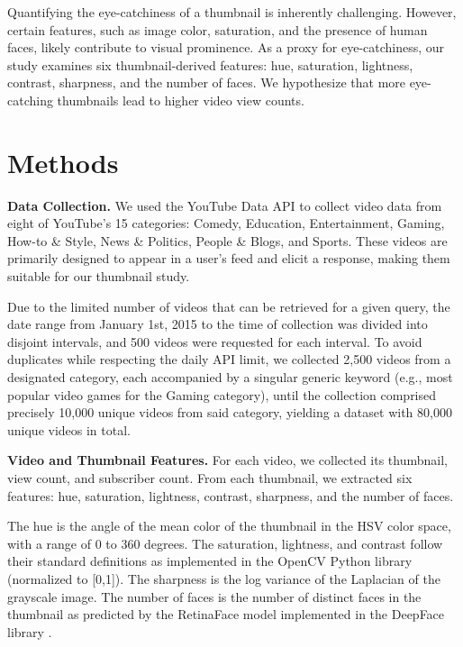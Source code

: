\documentclass{article}
\begin{document}
Quantifying the eye-catchiness of a thumbnail is inherently challenging. However, certain features, such as image color, saturation, and the presence of human faces, likely contribute to visual prominence. As a proxy for eye-catchiness, our study examines six thumbnail-derived features: hue, saturation, lightness, contrast, sharpness, and the number of faces. We hypothesize that more eye-catching thumbnails lead to higher video view counts.

\section{Methods}

\textbf{Data Collection.} We used the YouTube Data API \cite{youtubeapi} to collect video data from eight of YouTube's 15 categories: Comedy, Education, Entertainment, Gaming, How-to \& Style, News \& Politics, People \& Blogs, and Sports. These videos are primarily designed to appear in a user's feed and elicit a response, making them suitable for our thumbnail study.

Due to the limited number of videos that can be retrieved for a given query, the date range from January 1st, 2015 to the time of collection was divided into disjoint intervals, and 500 videos were requested for each interval. To avoid duplicates while respecting the daily API limit, we collected 2,500 videos from a designated category, each accompanied by a singular generic keyword (e.g., most popular video games for the Gaming category), until the collection comprised precisely 10,000 unique videos from said category, yielding a dataset with 80,000 unique videos in total.

\textbf{Video and Thumbnail Features.} For each video, we collected its thumbnail, view count, and subscriber count. From each thumbnail, we extracted six features: hue, saturation, lightness, contrast, sharpness, and the number of faces.

The hue is the angle of the mean color of the thumbnail in the HSV color space, with a range of 0 to 360 degrees. The saturation, lightness, and contrast follow their standard definitions as implemented in the OpenCV Python library (normalized to [0,1]). The sharpness is the log variance of the Laplacian of the grayscale image. The number of faces is the number of distinct faces in the thumbnail as predicted by the RetinaFace model implemented in the DeepFace library \cite{serengil2024lightface,serengil2020lightface}.
\end{document}
